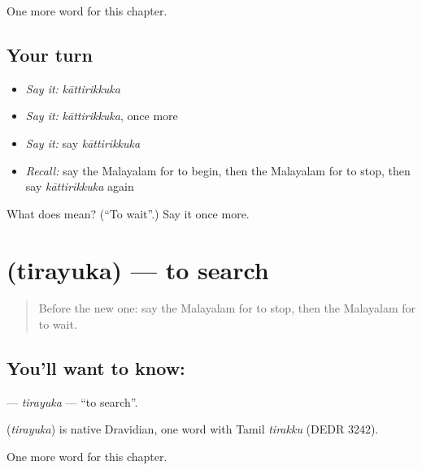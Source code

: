 \begin{grammarlens}[title={What you've built}]
One more word for this chapter.
\end{grammarlens}

\subsection*{Your turn}
\begin{itemize}
\raggedright
  \item \emph{Say it:} \emph{kāttirikkuka}
  \item \emph{Say it:} \emph{kāttirikkuka}, once more
  \item \emph{Say it:} say \emph{kāttirikkuka}
  \item \emph{Recall:} say the Malayalam for to begin, then the Malayalam for to stop, then say \emph{kāttirikkuka} again
\end{itemize}

\begin{tcolorbox}[breakable,colback=teal!4,colframe=teal!35!black,title={Before you move on}]
What does  mean? (\textquotedblleft{}To wait\textquotedblright{}.) Say it once more.
\end{tcolorbox}
\section[\texorpdfstring{\ml{തിരയുക} (tirayuka)}{തിരയുക (tirayuka)}]{ (tirayuka) — to search}

\label{lesson:ML-C174-tirayuka}



\begin{quote}
Before the new one: say the Malayalam for to stop, then the Malayalam for to wait.
\end{quote}

\subsection*{You'll want to know: }
\textbf{} — \emph{tirayuka} — \textquotedblleft{}to search\textquotedblright{}.

\begin{cousinweb}
\textbf{} (\emph{tirayuka}) is native Dravidian, one word with Tamil \emph{tirakku} (DEDR 3242).
\end{cousinweb}

\begin{grammarlens}[title={What you've built}]
One more word for this chapter.
\end{grammarlens}

